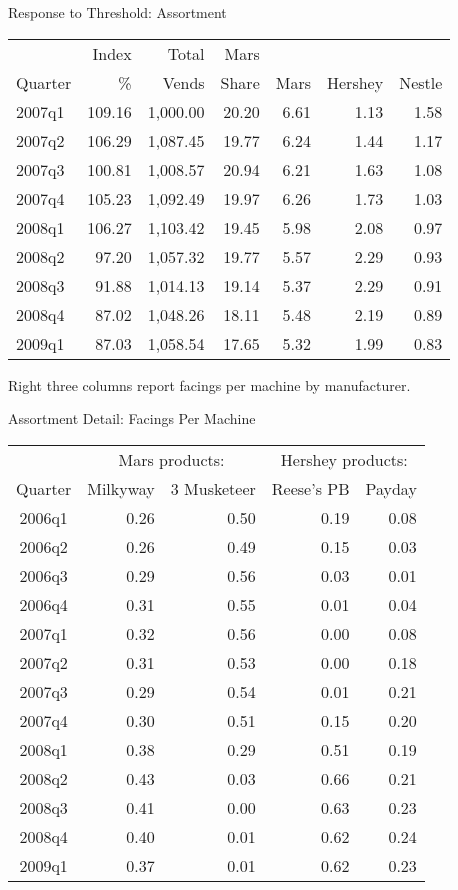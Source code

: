 \documentclass[aspectratio=169]{beamer}
\begin{document}
\begin{frame}{Response to Threshold: Assortment}
\small
\begin{tabular}{|l | rrr | rrr|} \hline
 & Index  & Total & Mars  & &  &  \\ 
Quarter & \% & Vends & Share & Mars & Hershey & Nestle \\ \hline \hline
2007q1 & 109.16 & 1,000.00 & 20.20 & 6.61 & 1.13 & 1.58 \\
2007q2 & 106.29 & 1,087.45 & 19.77 & 6.24 & 1.44 & 1.17 \\
2007q3 & 100.81 & 1,008.57 & 20.94 & 6.21 & 1.63 & 1.08 \\
2007q4 & 105.23 & 1,092.49 & 19.97 & 6.26 & 1.73 & 1.03 \\
2008q1 & 106.27 & 1,103.42 & 19.45 & 5.98 & 2.08 & 0.97 \\  \arrayrulecolor{red} \hline
\arrayrulecolor{black}
2008q2 & 97.20 & 1,057.32 & 19.77 & 5.57 & 2.29 & 0.93 \\ 
2008q3 & 91.88 & 1,014.13 & 19.14 & 5.37 & 2.29 & 0.91 \\
2008q4 & 87.02 & 1,048.26 & 18.11 & 5.48 & 2.19 & 0.89 \\
2009q1 & 87.03 & 1,058.54 & 17.65 & 5.32 & 1.99 & 0.83 \\ \hline
\end{tabular}

Right three columns report facings per machine by manufacturer.
\end{frame}

\begin{frame}{Assortment Detail: Facings Per Machine}
\small
\begin{center}
\begin{tabular}{|c | r r r r|} \hline
&\multicolumn{2}{c}{Mars products:}&\multicolumn{2}{c|}{Hershey products:}\\
Quarter &  Milkyway &  3 Musketeer & Reese's PB & Payday \\
\hline\hline
2006q1 & 0.26 & 0.50 & 0.19 & 0.08 \\
2006q2 & 0.26 & 0.49 & 0.15 & 0.03 \\
2006q3 & 0.29 & 0.56 & 0.03 & 0.01 \\
2006q4 & 0.31 & 0.55 & 0.01 & 0.04 \\
2007q1 & 0.32 & 0.56 & 0.00 & 0.08 \\
2007q2 & 0.31 & 0.53 & 0.00 & 0.18 \\
2007q3 & 0.29 & 0.54 & 0.01 & 0.21 \\
2007q4 & 0.30 & 0.51 & 0.15 & 0.20 \\
2008q1 & 0.38 & 0.29 & 0.51 & 0.19 \\ \arrayrulecolor{red} \hline
\arrayrulecolor{black}
2008q2 & 0.43 & 0.03 & 0.66 & 0.21 \\ 
2008q3 & 0.41 & 0.00 & 0.63 & 0.23 \\
2008q4 & 0.40 & 0.01 & 0.62 & 0.24 \\
2009q1 & 0.37 & 0.01 & 0.62 & 0.23 \\ \hline
\end{tabular}
\end{center}
\end{frame}
\end{document}
